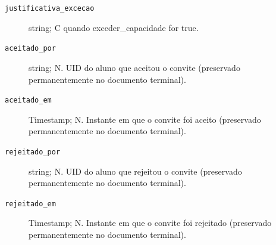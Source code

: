 \begin{description}
\item[\texttt{justificativa\_excecao}] string; C quando exceder\_capacidade for true.
\item[\texttt{aceitado\_por}] string; N. UID do aluno que aceitou o convite (preservado permanentemente no documento terminal).
\item[\texttt{aceitado\_em}] Timestamp; N. Instante em que o convite foi aceito (preservado permanentemente no documento terminal).
\item[\texttt{rejeitado\_por}] string; N. UID do aluno que rejeitou o convite (preservado permanentemente no documento terminal).
\item[\texttt{rejeitado\_em}] Timestamp; N. Instante em que o convite foi rejeitado (preservado permanentemente no documento terminal).
\end{description}

